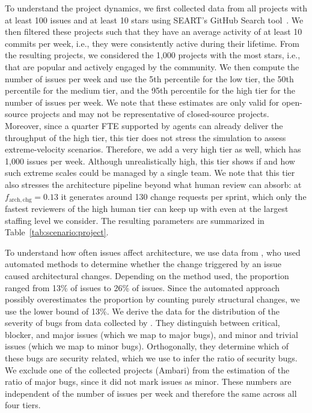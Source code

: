 \documentclass[smallextended]{svjour3}       %
\begin{document}
To understand the project dynamics, we first collected data from all projects with at least 100 issues and at least 10 stars using SEART's GitHub Search tool~\citep{dabic2021data}. We then filtered these projects such that they have an average activity of at least 10 commits per week, i.e., they were consistently active during their lifetime. From the resulting projects, we considered the 1{,}000 projects with the most stars, i.e., that are popular and actively engaged by the community. We then compute the number of issues per week and use the 5th percentile for the low tier, the 50th percentile for the medium tier, and the 95th percentile for the high tier for the number of issues per week. We note that these estimates are only valid for open-source projects and may not be representative of closed-source projects. Moreover, since a quarter FTE supported by agents can already deliver the throughput of the high tier, this tier does not stress the simulation to assess extreme-velocity scenarios. Therefore, we add a very high tier as well, which has 1{,}000 issues per week. Although unrealistically high, this tier shows if and how such extreme scales could be managed by a single team. We note that this tier also stresses the architecture pipeline beyond what human review can absorb: at $f_\mathrm{arch,chg} = 0.13$ it generates around 130 change requests per sprint, which only the fastest reviewers of the high human tier can keep up with even at the largest staffing level we consider. The resulting parameters are summarized in Table~\ref{tab:scenario:project}.

To understand how often issues affect architecture, we use data from \cite{shahbazian2018toward}, who used automated methods to determine whether the change triggered by an issue caused architectural changes. Depending on the method used, the proportion ranged from 13\% of issues to 26\% of issues. Since the automated approach possibly overestimates the proportion by counting purely structural changes, we use the lower bound of 13\%. We derive the data for the distribution of the severity of bugs from data collected by \cite{ohira2015highimpact}. They distinguish between critical, blocker, and major issues (which we map to major bugs), and minor and trivial issues (which we map to minor bugs). Orthogonally, they determine which of these bugs are security related, which we use to infer the ratio of security bugs. We exclude one of the collected projects (Ambari) from the estimation of the ratio of major bugs, since it did not mark issues as minor.
These numbers are independent of the number of issues per week and therefore the same across all four tiers.
\end{document}
